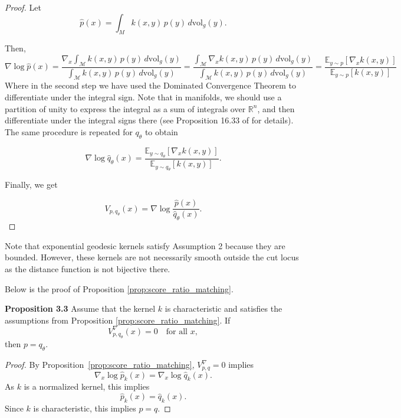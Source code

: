 \documentclass{article}
\theoremstyle{plain}
\newcommand{\M}{\mathcal{M}}
\begin{document}
\begin{proof} Let
\[
\hat p(x)=\int_M k(x,y)\,p(y)\,d\mathrm{vol}_g(y).
\]

Then, \[
\nabla \log \hat p(x)
= \frac{\displaystyle \nabla_{x} \int_{\M}  k(x,y)\,p(y)\,d\mathrm{vol}_g(y)}
{\displaystyle \int_{\M} k(x,y)\,p(y)\,d\mathrm{vol}_g(y)} =
\frac{\displaystyle \int_{\M} \nabla_{x} k(x,y)\,p(y)\,d\mathrm{vol}_g(y)}
{\displaystyle \int_{\M} k(x,y)\,p(y)\,d\mathrm{vol}_g(y)} 
=
\frac{
\mathbb{E}_{y\sim p}
\!\left[
\nabla_{x}
k\!\left(x,y
\right)
\right]
}{
\mathbb{E}_{y\sim p}
\!\left[
k\!\left(x,y
\right)
\right]
}
\]
Where in the second step we have used the Dominated Convergence Theorem to differentiate under the integral sign. Note that in manifolds, we should use a partition of unity to express the integral as a sum of integrals over $\mathbb{R}^n$, and then differentiate under the
integral signs there (see Proposition 16.33 of \cite{lee2012smooth} for details).  The same procedure is repeated for $q_\theta$ to obtain

\[
\nabla \log \hat q_\theta(x) =
\frac{
\mathbb{E}_{y\sim q_\theta}
\!\left[
\nabla_{x}
k\!\left(x,y
\right)
\right]
}{
\mathbb{E}_{y\sim q_\theta}
\!\left[
k\!\left(x,y
\right)
\right]
}.
\]

Finally, we get

\[V_{ p, q_\theta}(x) =  \nabla\log \frac{\hat p (x)}{\hat q_\theta (x)}.\]
\end{proof}


Note that exponential geodesic kernels satisfy Assumption 2 because they are bounded. However, these kernels are not necessarily smooth outside the cut locus as the distance function is not bijective there. 

Below is the proof of Proposition \ref{prop:score_ratio_matching}.

\textbf{Proposition 3.3 }
\label{prop:identifiability2}
Assume that the kernel \(k\) is characteristic and satisfies the assumptions from Proposition \ref{prop:score_ratio_matching}. If
\[
V^\nabla_{p,q_\theta}(x)=0
\quad \text{for all } x,
\]
then \(p=q_\theta\).


\begin{proof}
By Proposition~\ref{prop:score_ratio_matching}, \(V^\nabla_{p,q}=0\) implies
\[
\nabla_x \log \widehat{p}_k(x)
=
\nabla_x \log \widehat{q}_k(x).
\]
As $k$ is a normalized kernel, this implies
\[
\widehat{p}_k(x)
=
\widehat{q}_k(x).
\]
Since \(k\) is characteristic, this implies \(p=q\).
\end{proof}
\end{document}
